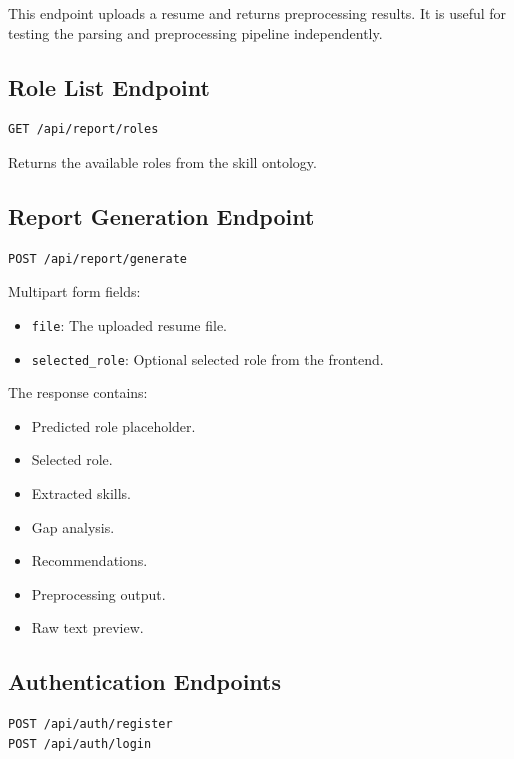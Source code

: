 \documentclass[12pt,a4paper]{article}
\begin{document}
This endpoint uploads a resume and returns preprocessing results. It is useful for testing the parsing and preprocessing pipeline independently.

\subsection{Role List Endpoint}

\begin{lstlisting}
GET /api/report/roles
\end{lstlisting}

Returns the available roles from the skill ontology.

\subsection{Report Generation Endpoint}

\begin{lstlisting}
POST /api/report/generate
\end{lstlisting}

Multipart form fields:

\begin{itemize}
    \item \texttt{file}: The uploaded resume file.
    \item \texttt{selected\_role}: Optional selected role from the frontend.
\end{itemize}

The response contains:

\begin{itemize}
    \item Predicted role placeholder.
    \item Selected role.
    \item Extracted skills.
    \item Gap analysis.
    \item Recommendations.
    \item Preprocessing output.
    \item Raw text preview.
\end{itemize}

\subsection{Authentication Endpoints}

\begin{lstlisting}
POST /api/auth/register
POST /api/auth/login
\end{lstlisting}
\end{document}
